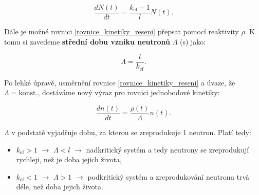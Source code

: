 $$ \dfrac{dN(t)}{dt} = \dfrac{k_{\text{ef}} - 1}{l} N(t). $$

Dále je možné rovnici \eqref{rovnice_kinetiky_reseni} přepsat pomocí reaktivity $\rho$. K tomu si zavedeme \textbf{střední dobu vzniku neutronů} $\Lambda$ (s) jako:

\begin{equation}
  \Lambda = \dfrac{l}{k_{\text{ef}}}.
  \label{stredni_doba_vzniku}
\end{equation}

Po lehké úpravě, usměrnění rovnice \eqref{rovnice_kinetiky_reseni} a úvaze, že $\Lambda = \text{konst.}$, dostáváme nový výraz pro rovnici jednobodové kinetiky:

\begin{equation}
  \dfrac{dn(t)}{dt} = \dfrac{\rho (t)}{\Lambda} n(t).
  \label{rovnice_kinetiky_reaktivita}
\end{equation}

$\Lambda$ v podstatě vyjadřuje dobu, za kterou se zreprodukuje 1 neutron. Platí tedy:

\begin{itemize}
  \item $k_{\text{ef}} > 1$ $\rightarrow$ $\Lambda < l$ $\rightarrow$ nadkritický systém a tedy neutrony se zreprodukují rychleji, než je doba jejich života,
  \item $k_{\text{ef}} < 1$ $\rightarrow$ $\Lambda > 1$ $\rightarrow$ podkritický systém a zreprodukování neutronu trvá déle, než doba jejich života.
\end{itemize}
